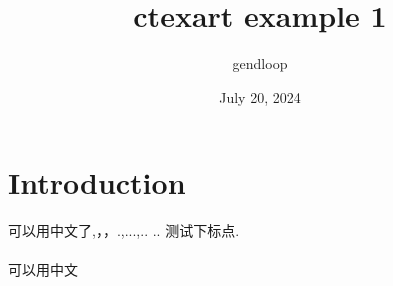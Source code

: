 \documentclass{ctexart}
\title{ctexart example 1}
\author{gendloop}
\date{July 20, 2024}
\begin{document}
\maketitle

\section{Introduction}
可以用中文了,，，.,...,.. .. 测试下标点.

\paragraph{}
可以用中文
\end{document}
